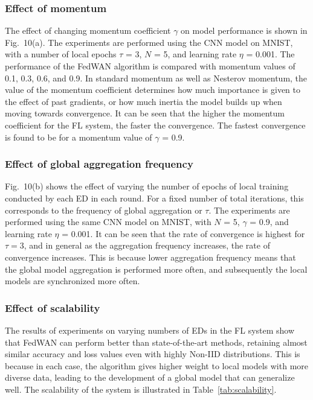 \documentclass[journal]{IEEEtran}
\begin{document}
\subsubsection{Effect of momentum}
The effect of changing momentum coefficient $\gamma$ on model performance is shown in Fig.~10(a). The experiments are performed using the CNN model on MNIST, with a number of local epochs $\tau$ = 3, $N$ = 5, and learning rate $\eta$ = 0.001. The performance of the FedWAN algorithm is compared with momentum values of 0.1, 0.3, 0.6, and 0.9. In standard momentum as well as Nesterov momentum, the value of the momentum coefficient determines how much importance is given to the effect of past gradients, or how much inertia the model builds up when moving towards convergence. It can be seen that the higher the momentum coefficient for the FL system, the faster the convergence. The fastest convergence is found to be for a momentum value of $\gamma$ = 0.9. 

\subsubsection{Effect of global aggregation frequency}
Fig.~10(b) shows the effect of varying the number of epochs of local training conducted by each ED in each round. For a fixed number of total iterations, this corresponds to the frequency of global aggregation or $\tau$. The experiments are performed using the same CNN model on MNIST, with $N$ = 5, $\gamma$ = 0.9, and learning rate $\eta$ = 0.001. It can be seen that the rate of convergence is highest for $\tau = 3$, and in general as the aggregation frequency increases, the rate of convergence increases. This is because lower aggregation frequency means that the global model aggregation is performed more often, and subsequently the local models are synchronized more often. 

\subsubsection{Effect of scalability}
The results of experiments on varying numbers of EDs in the FL system show that FedWAN can perform better than state-of-the-art methods, retaining almost similar accuracy and loss values even with highly Non-IID distributions. This is because in each case, the algorithm gives higher weight to local models with more diverse data, leading to the development of a global model that can generalize well. The scalability of the system is illustrated in Table~\ref{tab:scalability}. 
\end{document}
